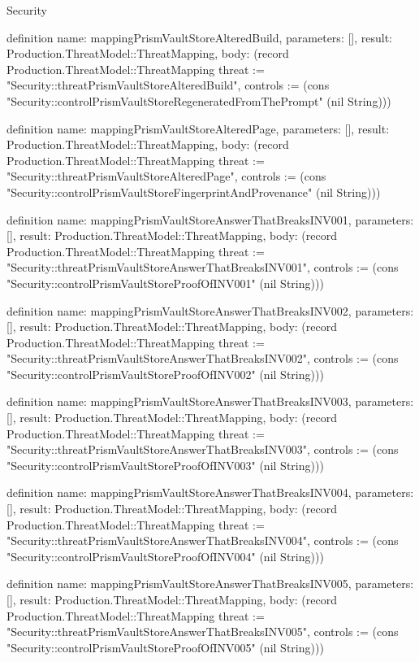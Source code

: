 \begin{lexlean}{Security}
\begin{semanticmodule}
definition{
  name: mappingPrismVaultStoreAlteredBuild,
  parameters: [],
  result: Production.ThreatModel::ThreatMapping,
  body: (record Production.ThreatModel::ThreatMapping {threat := "Security::threatPrismVaultStoreAlteredBuild", controls := (cons "Security::controlPrismVaultStoreRegeneratedFromThePrompt" (nil String))})
}

definition{
  name: mappingPrismVaultStoreAlteredPage,
  parameters: [],
  result: Production.ThreatModel::ThreatMapping,
  body: (record Production.ThreatModel::ThreatMapping {threat := "Security::threatPrismVaultStoreAlteredPage", controls := (cons "Security::controlPrismVaultStoreFingerprintAndProvenance" (nil String))})
}

definition{
  name: mappingPrismVaultStoreAnswerThatBreaksINV001,
  parameters: [],
  result: Production.ThreatModel::ThreatMapping,
  body: (record Production.ThreatModel::ThreatMapping {threat := "Security::threatPrismVaultStoreAnswerThatBreaksINV001", controls := (cons "Security::controlPrismVaultStoreProofOfINV001" (nil String))})
}

definition{
  name: mappingPrismVaultStoreAnswerThatBreaksINV002,
  parameters: [],
  result: Production.ThreatModel::ThreatMapping,
  body: (record Production.ThreatModel::ThreatMapping {threat := "Security::threatPrismVaultStoreAnswerThatBreaksINV002", controls := (cons "Security::controlPrismVaultStoreProofOfINV002" (nil String))})
}

definition{
  name: mappingPrismVaultStoreAnswerThatBreaksINV003,
  parameters: [],
  result: Production.ThreatModel::ThreatMapping,
  body: (record Production.ThreatModel::ThreatMapping {threat := "Security::threatPrismVaultStoreAnswerThatBreaksINV003", controls := (cons "Security::controlPrismVaultStoreProofOfINV003" (nil String))})
}

definition{
  name: mappingPrismVaultStoreAnswerThatBreaksINV004,
  parameters: [],
  result: Production.ThreatModel::ThreatMapping,
  body: (record Production.ThreatModel::ThreatMapping {threat := "Security::threatPrismVaultStoreAnswerThatBreaksINV004", controls := (cons "Security::controlPrismVaultStoreProofOfINV004" (nil String))})
}

definition{
  name: mappingPrismVaultStoreAnswerThatBreaksINV005,
  parameters: [],
  result: Production.ThreatModel::ThreatMapping,
  body: (record Production.ThreatModel::ThreatMapping {threat := "Security::threatPrismVaultStoreAnswerThatBreaksINV005", controls := (cons "Security::controlPrismVaultStoreProofOfINV005" (nil String))})
}


\end{semanticmodule}
\end{lexlean}

